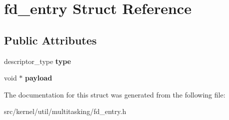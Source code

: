 \hypertarget{structfd__entry}{}\section{fd\+\_\+entry Struct Reference}
\label{structfd__entry}
\subsection*{Public Attributes}
\begin{DoxyCompactItemize}
\item 
\mbox{\label{structfd__entry_adc372a641a1e091acd7038e15dadc615}} 
descriptor\+\_\+type {\bfseries type}
\item 
\mbox{\label{structfd__entry_aea54ec085013370e769e12b7bdab4fa1}} 
void $\ast$ {\bfseries payload}
\end{DoxyCompactItemize}


The documentation for this struct was generated from the following file\+:\begin{DoxyCompactItemize}
\item 
src/kernel/util/multitasking/fd\+\_\+entry.\+h\end{DoxyCompactItemize}
